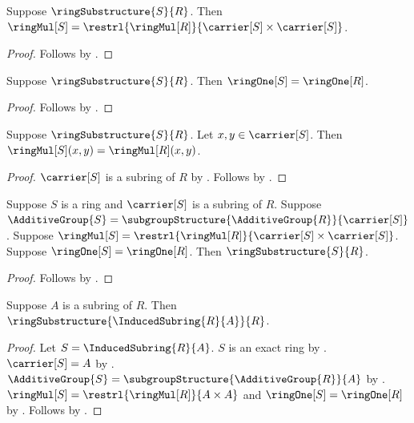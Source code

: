 \begin{proposition}\label{ring_substructure_mul_graph}
    Suppose $\ringSubstructure{S}{R}$.
    Then $\ringMul[S]=\restrl{\ringMul[R]}{
        \carrier[S]\times\carrier[S]}$.
\end{proposition}
\begin{proof}
    Follows by .
\end{proof}

\begin{proposition}\label{ring_substructure_one}
    Suppose $\ringSubstructure{S}{R}$.
    Then $\ringOne[S]=\ringOne[R]$.
\end{proposition}
\begin{proof}
    Follows by .
\end{proof}

\begin{proposition}\label{ring_substructure_mul_apply}
    Suppose $\ringSubstructure{S}{R}$.
    Let $x,y\in\carrier[S]$.
    Then $\ringMul[S](x,y)=\ringMul[R](x,y)$.
\end{proposition}
\begin{proof}
    $\carrier[S]$ is a subring of $R$ by
        .
    Follows by
        .
\end{proof}

\begin{proposition}\label{ring_substructure_intro}
    Suppose $S$ is a ring and $\carrier[S]$ is a subring of $R$.
    Suppose $\AdditiveGroup{S}
        =\subgroupStructure{\AdditiveGroup{R}}{\carrier[S]}$.
    Suppose $\ringMul[S]=\restrl{\ringMul[R]}{
        \carrier[S]\times\carrier[S]}$.
    Suppose $\ringOne[S]=\ringOne[R]$.
    Then $\ringSubstructure{S}{R}$.
\end{proposition}
\begin{proof}
    Follows by .
\end{proof}

\begin{theorem}\label{induced_subring_is_ring_substructure}
    Suppose $A$ is a subring of $R$.
    Then $\ringSubstructure{\InducedSubring{R}{A}}{R}$.
\end{theorem}
\begin{proof}
    Let $S=\InducedSubring{R}{A}$.
    $S$ is an exact ring by .
    $\carrier[S]=A$ by
        .
    $\AdditiveGroup{S}=\subgroupStructure{\AdditiveGroup{R}}{A}$ by
        .
    $\ringMul[S]=\restrl{\ringMul[R]}{A\times A}$ and
        $\ringOne[S]=\ringOne[R]$ by
        .
    Follows by .
\end{proof}

